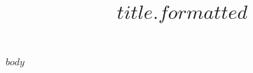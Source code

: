 \documentclass[article]{jss}
\author{
  $for(author)$$author.name$\\$author.affiliation$$sep$ \And $$endfor$
}
\title{$title.formatted$}
\begin{document}
$body$
\end{document}
